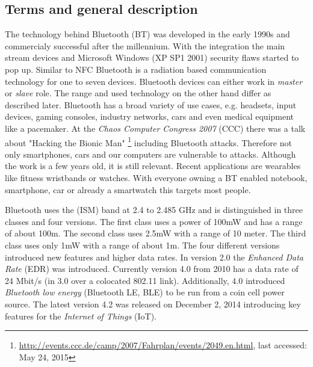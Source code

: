\documentclass[12pt,a4paper]{article}
\begin{document}
\subsection{Terms and general description}
The technology behind Bluetooth (BT) was developed in the early 1990s and commercialy successful after the millennium. With the integration  the main stream devices and Microsoft Windows (XP SP1 2001) security flaws started to pop up. Similar to NFC Bluetooth is a radiation based communication technology for one to seven devices. Bluetooth devices can either work in \emph{master} or \emph{slave} role. The range and used technology on the other hand differ as described later. 
Bluetooth has a broad variety of use cases, e.g. headsets, input devices, gaming consoles, industry networks, cars and even medical equipment like a pacemaker. At the \emph{Chaos Computer Congress 2007} (CCC) there was a talk about "Hacking the Bionic Man" \footnote{\url{http://events.ccc.de/camp/2007/Fahrplan/events/2049.en.html}, last accessed: May 24, 2015} including Bluetooth attacks. Therefore not only smartphones, cars and our computers are vulnerable to attacks.
Although the work is a few years old, it is still relevant. Recent applications are wearables like fitness wristbands or watches. With everyone owning a BT enabled notebook, smartphone, car or already a smartwatch this targets most people.

Bluetooth uses the (ISM) band at 2.4 to 2.485 GHz and is distinguished in three classes and four versions. The first class uses a power of 100mW and has a range of about 100m. The second class uses 2.5mW with a range of 10 meter. The third class uses only 1mW with a range of about 1m.
The four different versions introduced new features and higher data rates. In version 2.0 the \emph{Enhanced Data Rate} (EDR) was introduced. Currently version 4.0 from 2010 has a data rate of 24 Mbit/s (in 3.0 over a colocated 802.11 link). Additionally, 4.0 introduced \emph{Bluetooth low energy} (Bluetooth LE, BLE) to be run from a coin cell power source. The latest version 4.2 was released on December 2, 2014 introducing key features for the \emph{Internet of Things} (IoT).
\end{document}
